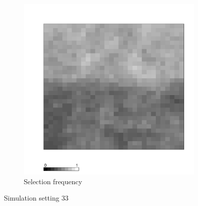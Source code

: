 \documentclass[authoryear, review, 11pt]{elsarticle}
\begin{document}
\begin{figure}
	\begin{subfigure}[b]{0.45\textwidth}
	\centering
		\includegraphics[width=\textwidth]{../../figures/simulation/X1.15.33.selection.pdf}
		\caption{Selection frequency}
	\end{subfigure}
	\caption{Simulation setting 33}
\end{figure}

\clearpage
\end{document}
